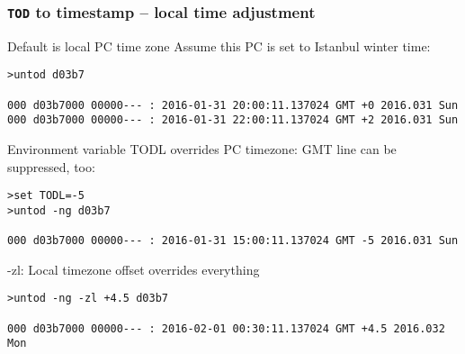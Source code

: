 \documentclass[10pt,xcolor=x11names]{beamer}
\newcommand{\tod}{\texttt{TOD}}
\begin{document}
\begin{frame}[fragile]
  \frametitle{\tod{} to timestamp -- local time adjustment}
  \begin{block}{Default is local PC time zone}
Assume this PC is set to Istanbul winter time:
  \begin{lstlisting}
>untod d03b7

000 d03b7000 00000--- : 2016-01-31 20:00:11.137024 GMT +0 2016.031 Sun
000 d03b7000 00000--- : 2016-01-31 22:00:11.137024 GMT +2 2016.031 Sun
  \end{lstlisting}
  \end{block}
  \begin{block}{Environment variable TODL overrides PC timezone:}
GMT line can be suppressed, too:    
  \begin{lstlisting}
>set TODL=-5
>untod -ng d03b7

000 d03b7000 00000--- : 2016-01-31 15:00:11.137024 GMT -5 2016.031 Sun
  \end{lstlisting}
  \end{block}

  \begin{block}{-zl: Local timezone offset overrides everything}
    
  \begin{lstlisting}
>untod -ng -zl +4.5 d03b7

000 d03b7000 00000--- : 2016-02-01 00:30:11.137024 GMT +4.5 2016.032 Mon
  \end{lstlisting}
  \end{block}

\end{frame}
\end{document}
